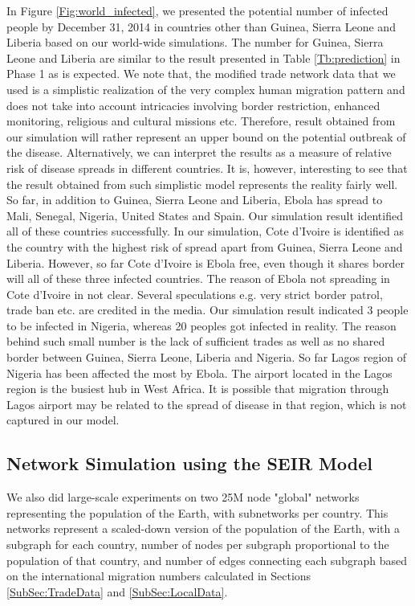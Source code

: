 \documentclass[10pt, journal,onecolumn]{IEEEtran}
\begin{document}
In Figure \ref{Fig:world_infected}, we presented the potential number of infected people by December
31, 2014 in countries other than Guinea, Sierra Leone and Liberia based on our world-wide
simulations. The number for Guinea, Sierra Leone and Liberia are similar to the result presented in
Table \ref{Tb:prediction} in Phase 1 as is expected. We note that, the modified trade network data
that we used is a simplistic realization of the very complex human migration pattern and does not
take into account intricacies involving border restriction, enhanced monitoring, religious and
cultural missions etc. Therefore, result obtained from our simulation  will rather represent  an
upper bound on the potential outbreak of the disease. Alternatively, we can interpret the results as
a measure of relative risk of disease spreads in different countries. It is, however, interesting to
see that the result obtained from such simplistic model represents the reality fairly well. So far,
in addition to  Guinea, Sierra Leone and Liberia, Ebola has spread to Mali, Senegal, Nigeria, United
States and Spain. Our simulation result identified all of these countries successfully. In our
simulation, Cote d'Ivoire is identified as the country with the highest risk of spread apart from
Guinea, Sierra Leone and Liberia. However, so far Cote d'Ivoire is Ebola free, even though it shares
border will all of these three infected countries. The reason of Ebola not spreading in Cote
d'Ivoire in not clear. Several speculations e.g. very strict border patrol, trade ban etc. are
credited in the media. Our simulation result indicated 3 people to be infected in Nigeria, whereas
20 peoples got infected in reality. The reason behind such small number is the lack of sufficient
trades as well as no shared border between Guinea, Sierra Leone, Liberia and Nigeria. So far Lagos
region of Nigeria has been affected the most by Ebola. The airport located in the Lagos region is
the busiest hub in West Africa. It is possible that migration through Lagos airport may be related
to the spread of disease in that region, which is not captured in our model.


\subsection{{Network Simulation using the SEIR Model}}
\label{SubSec:GraphX}

We also did large-scale experiments on two 25M node "global" networks representing the population
of the Earth, with subnetworks per country. This networks represent a scaled-down version of the
population of the Earth, with a subgraph for each country, number of nodes per subgraph proportional
to the population of that country, and number of edges connecting each subgraph based on the
international migration numbers calculated in Sections \ref{SubSec:TradeData} and \ref{SubSec:LocalData}.
\end{document}
